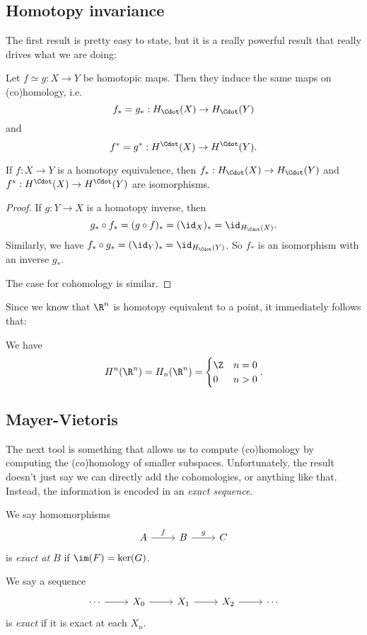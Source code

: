 \documentclass[a4paper]{article}
\theoremstyle{definition}
\begin{document}
\subsection{Homotopy invariance}
The first result is pretty easy to state, but it is a really powerful result that really drives what we are doing:

\begin{thm}
  Let $f \simeq g: X \to Y$ be homotopic maps. Then they induce the same maps on (co)homology, i.e.
  \[
    f_* = g_*: H_\Cdot(X) \to H_\Cdot(Y)
  \]
  and
  \[
    f^* = g^* : H^\Cdot(X) \to H^\Cdot(Y).
  \]
\end{thm}

\begin{cor}
  If $f: X \to Y$ is a homotopy equivalence, then $f_*: H_{\Cdot}(X) \to H_{\Cdot}(Y)$ and $f^*: H^{\Cdot}(X) \to H^{\Cdot}(Y)$ are isomorphisms.
\end{cor}

\begin{proof}
  If $g: Y \to X$ is a homotopy inverse, then
  \[
    g_* \circ f_* = (g \circ f)_* = (\id_X)_* = \id_{H_{\Cdot}(X)}.
  \]
  Similarly, we have $f_* \circ g_* = (\id_Y)_* = \id_{H_{\Cdot}(Y)}$. So $f_*$ is an isomorphism with an inverse $g_*$.

  The case for cohomology is similar.
\end{proof}

Since we know that $\R^n$ is homotopy equivalent to a point, it immediately follows that:
\begin{eg}
  We have
  \[
    H^n(\R^n) = H_n(\R^n) =
    \begin{cases}
      \Z & n = 0\\
      0 & n > 0
    \end{cases}.
  \]
\end{eg}

\subsection{Mayer-Vietoris}
The next tool is something that allows us to compute (co)homology by computing the (co)homology of smaller subspaces. Unfortunately, the result doesn't just say we can directly add the cohomologies, or anything like that. Instead, the information is encoded in an \emph{exact sequence}.

\begin{defi}
  We say homomorphisms
  \[
    \begin{tikzcd}
      A \ar[r, "f"] & B \ar[r, "g"] & C
    \end{tikzcd}
  \]
  is \emph{exact at $B$} if $\im(F) = \ker(G)$.

  We say a sequence
  \[
    \begin{tikzcd}
      \cdots \ar[r] & X_0 \ar[r] & X_1 \ar[r] & X_2 \ar[r] & \cdots
    \end{tikzcd}
  \]
  is \emph{exact} if it is exact at each $X_n$.
\end{defi}
\end{document}
